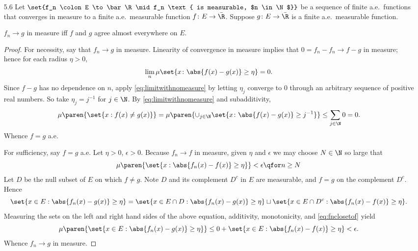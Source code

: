 \documentclass[onesided]{ccg-pset}
\author{Colton Grainger}
\date{\today}
\begin{document}
\maketitle

\begin{enumerate}

\item[5.6] 
Let $\set{f_n \colon E \to \bar\R \mid f_n \text{ is measurable, $n \in \N$}}$ be a sequence of finite a.e.~functions that converges in measure to a finite a.e.~measurable function $f \colon E \to \bar\R$. Suppose $g \colon E \to \bar\R$ is a finite a.e.~measurable function.

\begin{prop*}
    $f_n \to g$ in measure iff $f$ and $g$ agree almost everywhere on $E$.
\end{prop*}

\begin{proof}
For necessity, say that $f_n \to g$ in measure. Linearity of convergence in measure implies that $0 = f_n -  f_n \to f - g$ in measure; hence for each radius $\eta > 0$, 
\begin{equation}
    \label{eq:limitwithnomeasure}
    \lim_n \mu\set{x \colon \abs{f(x) - g(x)} \ge \eta} = 0.
\end{equation}
Since $f-g$ has no dependence on $n$, apply \eqref{eq:limitwithnomeasure} by letting $\eta_j$ converge to $0$ through an arbitrary sequence of positive real numbers. So take $\eta_j = j^{-1}$ for $j \in \N$. By \eqref{eq:limitwithnomeasure} and subadditivity, 
\begin{equation*}
    \mu\paren{\set{x: f(x) \neq g(x)}} = \mu \paren{\cup_{j \in\N} \set{x \colon \abs{f(x) - g(x)} \ge j^{-1}}} \le \sum_{j \in \N} 0 = 0.
\end{equation*}
Whence $f = g$ a.e. 

For sufficiency, say $f = g$ a.e. Let $\eta > 0$, $\epsilon > 0$. Because $f_n \to f$ in measure, given $\eta$ and $\epsilon$ we may choose $N \in \N$ so large that 
\begin{equation}
\label{eq:fnclosetof}
    \mu\paren{\set{x : \abs{f_n(x) - f(x)} \ge \eta}} < \epsilon \qfor n \ge N
\end{equation}
Let $D$ be the null subset of $E$ on which $f \neq g$. Note $D$ and its complement $D^c$ in $E$ are measurable, and $f = g$ on the complement $D^c$. Hence
\begin{equation*}
    \set{x \in E : \abs{f_n(x) - g(x)} \ge \eta} = \set{x \in E\cap D : \abs{f_n(x) - g(x)} \ge \eta} \sqcup \set{x \in E \cap D^c: \abs{f_n(x) - f(x)} \ge \eta}.
\end{equation*}
Measuring the sets on the left and right hand sides of the above equation, additivity, monotonicity, and \eqref{eq:fnclosetof} yield
\begin{equation*}
    \mu\paren{\set{x \in E : \abs{f_n(x) - g(x)} \ge \eta}} \le 0 + \set{x \in E:\abs{f_n(x) - f(x)} \ge \eta} < \epsilon.
\end{equation*}
Whence $f_n \to g$ in measure.
\end{proof}


\end{enumerate}
\end{document}
